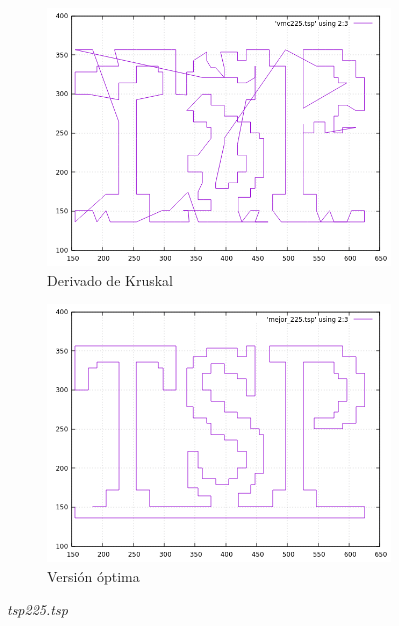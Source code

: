 \documentclass[12pt,spanish]{article}
\begin{document}
\begin{figure}[H]
\begin{subfigure}[b]{0.36\textwidth}
\includegraphics[width=\textwidth]{tsp225_vmc.png}
\caption{Derivado de Kruskal}
\end{subfigure}
\quad
\begin{subfigure}[b]{0.36\textwidth}
\includegraphics[width=\textwidth]{tsp225_mejor.png}
\caption{Versión óptima}
\end{subfigure}
\caption{\textit{tsp225.tsp}}
\end{figure}
\end{document}
